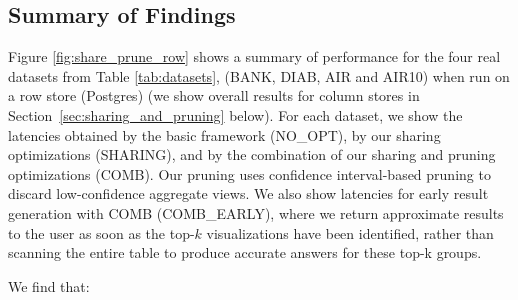 \subsection{Summary of Findings}
\label{sec:expt_summary}

Figure \ref{fig:share_prune_row} shows a summary of \SeeDB performance for the four real datasets from Table \ref{tab:datasets}, (BANK, DIAB, AIR and AIR10) when run on a row store (Postgres) (we show overall results for column stores in Section~\ref{sec:sharing_and_pruning} below).
For each dataset, we show the latencies obtained by the basic \SeeDB framework (NO\_OPT), by our sharing optimizations (SHARING), and by the combination of our sharing and pruning optimizations (COMB). Our pruning uses confidence interval-based pruning to discard low-confidence aggregate views.
We also show latencies for early result generation with COMB (COMB\_EARLY), where we return approximate results to the user as soon as the top-$k$ visualizations have been identified, rather than scanning the entire table to produce accurate answers for these top-k groups.



We find that: 

